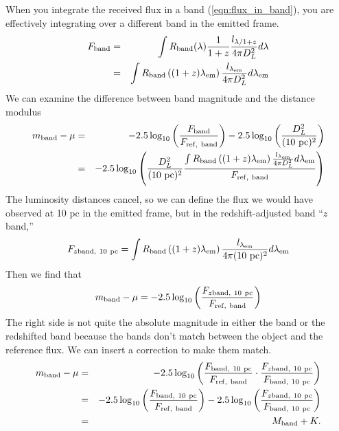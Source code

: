When you integrate the received flux in a band (\ref{eqn:flux_in_band}), you are effectively integrating over a different band in the emitted frame.
\begin{eqnarray}
  F_{\rm band} &=& \int R_{\rm band}(\lambda) \frac{1}{1+z} \frac{l_{\lambda/1+z}}{4\pi D_L^2}  d\lambda \label{eqn:flux_from_redshift} \\
  &=& \int  R_{\rm band}\left((1+z) \lambda_{\rm em} \right)   \frac{l_{\lambda_{\rm em}}}{4\pi D_L^2} d\lambda_{\rm em}
\end{eqnarray}
We can examine the difference between band magnitude and the distance modulus
\begin{eqnarray}
  m_{\rm band} - \mu &=& -2.5 \log_{10} \left(\frac{F_{\rm band}}{F_{\rm ref,\ band}} \right) - 2.5 \log_{10}  \left(\frac{D_L^2}{(10\ {\rm pc})^2} \right) \\
  &=& -2.5 \log_{10} \left( \frac{D_L^2}{({\rm 10\ pc})^2} \frac{ \int R_{\rm band}\left((1+z) \lambda_{\rm em} \right)   \frac{l_{\lambda_{\rm em}}}{4\pi D_L^2} d\lambda_{\rm em}      }{F_{\rm ref,\ band}} \right)  \nonumber
\end{eqnarray}
The luminosity distances cancel, so we can define the flux we would have observed at 10 pc in the emitted frame, but in the redshift-adjusted band ``$z$band,''
\begin{equation}
  F_{z\rm band,\ 10\ pc} =  \int R_{\rm band}\left((1+z) \lambda_{\rm em} \right)   \frac{l_{\lambda_{\rm em}}}{4\pi ({\rm 10\ pc})^2} d\lambda_{\rm em} 
\end{equation}
Then we find that 
\begin{eqnarray}
  m_{\rm band} - \mu = -2.5 \log_{10} \left(\frac{F_{z\rm band,\ 10\ pc}}{F_{\rm ref,\ band}} \right) \label{eqn:m_minus_mu_simple}
\end{eqnarray}
The right side is not quite the absolute magnitude in either the band or the redshifted band because the bands don't match between the object and the reference flux.  We can insert a correction to make them match.
\begin{eqnarray}
  m_{\rm band} - \mu &=& -2.5 \log_{10} \left(\frac{F_{\rm band,\ 10\ pc}}{F_{\rm ref,\ band}}\cdot \frac{F_{z\rm band,\ 10\ pc}}{F_{\rm band,\ 10\ pc}} \right) \\
  &=& -2.5 \log_{10} \left(\frac{F_{\rm band,\ 10\ pc}}{F_{\rm ref,\ band}}  \right)  -2.5 \log_{10} \left( \frac{F_{z\rm band,\ 10\ pc}}{F_{\rm band,\ 10\ pc}} \right) \\
  &=& M_{\rm band}  +K. %
\end{eqnarray}
